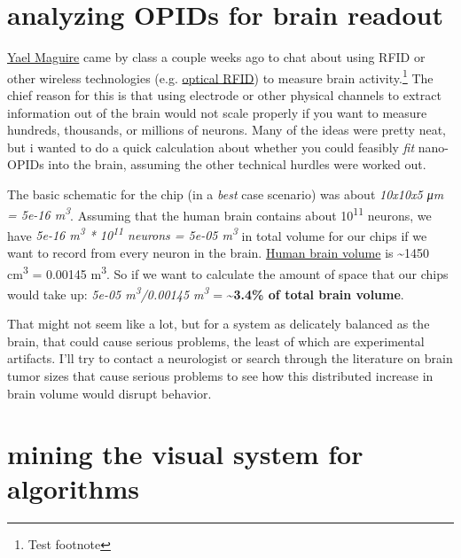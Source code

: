 

	\section{analyzing OPIDs for brain readout} %
	\label{sub:analyzing_opids_for_brain_readout}


		\href{http://web.media.mit.edu/~yael/}{Yael Maguire} came by class a couple weeks ago to chat about using RFID or other wireless technologies (e.g. \href{http://en.wikipedia.org/wiki/Optical\_RFID}{optical RFID})
		to measure brain activity.\footnote{Test footnote} The chief reason for this is that using electrode or other physical channels to extract information out of the brain would not scale properly if you want to measure hundreds,
		thousands, or millions of neurons. Many of the ideas were pretty neat,
		but i wanted to do a quick calculation about whether you could feasibly \emph{fit} nano-OPIDs into the brain, assuming the other technical hurdles were worked out.

		The basic schematic for the chip (in a \emph{best} case scenario) was about \emph{10x10x5 μm = 5e-16 m\textsuperscript{3}}. Assuming that the human brain contains about 10\textsuperscript{11} neurons, we have \emph{5e-16 m\textsuperscript{3} * 10\textsuperscript{11} neurons =
		5e-05 m\textsuperscript{3}} in total volume for our chips if we want to record from every neuron in the brain.
		\href{http://hypertextbook.com/facts/2001/ViktoriyaShchupak.shtml}{Human brain volume} is \textasciitilde{}1450 cm\textsuperscript{3} = 0.00145 m\textsuperscript{3}. So if we want to calculate the amount of space that our chips would take up: \emph{5e-05 m\textsuperscript{3}/0.00145 m\textsuperscript{3}} = \textbf{\textasciitilde{}3.4\% of total brain volume}.

		That might not seem like a lot, but for a system as delicately balanced as the brain, that could cause serious problems, the least of which are experimental artifacts. I'll try to contact a neurologist or search through the literature on brain tumor sizes that cause serious problems to see how this distributed increase in brain volume would disrupt behavior.


	\section{mining the visual system for algorithms}

